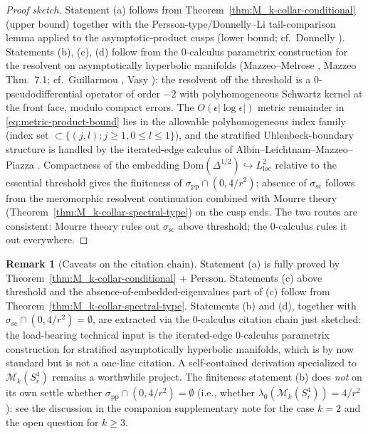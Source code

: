 \documentclass[11pt,letterpaper]{article}
\theoremstyle{definition}
\newtheorem{remark}[theorem]{Remark}
\newcommand{\cM}{\mathcal{M}}
\newcommand{\Lap}{\Delta}
\begin{document}
\begin{proof}[Proof sketch]
Statement (a) follows from Theorem~\ref{thm:M_k-collar-conditional} (upper bound) together with the Persson-type/Donnelly--Li tail-comparison lemma applied to the asymptotic-product cusps (lower bound; cf.\ Donnelly \cite{Donnelly1981}). Statements (b), (c), (d) follow from the 0-calculus parametrix construction for the resolvent on asymptotically hyperbolic manifolds (Mazzeo--Melrose \cite{MazzeoMelrose1987}, Mazzeo \cite{Mazzeo1991} Thm.~7.1; cf.\ Guillarmou \cite{Guillarmou2005}, Vasy \cite{Vasy2013}): the resolvent off the threshold is a $0$-pseudodifferential operator of order $-2$ with polyhomogeneous Schwartz kernel at the front face, modulo compact errors. The $O(\epsilon|\log\epsilon|)$ metric remainder in \eqref{eq:metric-product-bound} lies in the allowable polyhomogeneous index family (index set $\subset \{(j,l) : j \ge 1, 0 \le l \le 1\}$), and the stratified Uhlenbeck-boundary structure is handled by the iterated-edge calculus of Albin--Leichtnam--Mazzeo--Piazza \cite{ALMP2012}. Compactness of the embedding $\mathrm{Dom}(\Lap^{1/2}) \hookrightarrow L^2_{\mathrm{loc}}$ relative to the essential threshold gives the finiteness of $\sigma_{\mathrm{pp}}\cap(0, 4/r^2)$; absence of $\sigma_{\mathrm{sc}}$ follows from the meromorphic resolvent continuation combined with Mourre theory (Theorem~\ref{thm:M_k-collar-spectral-type}) on the cusp ends. The two routes are consistent: Mourre theory rules out $\sigma_{\mathrm{sc}}$ above threshold; the 0-calculus rules it out everywhere.
\end{proof}

\begin{remark}[Caveats on the citation chain]\label{rmk:MM-caveats}
Statement (a) is fully proved by Theorem~\ref{thm:M_k-collar-conditional} + Persson. Statements (c) above threshold and the absence-of-embedded-eigenvalues part of (c) follow from Theorem~\ref{thm:M_k-collar-spectral-type}. Statements (b) and (d), together with $\sigma_{\mathrm{sc}}\cap(0, 4/r^2) = \emptyset$, are extracted via the 0-calculus citation chain just sketched: the load-bearing technical input is the iterated-edge $0$-calculus parametrix construction for stratified asymptotically hyperbolic manifolds, which is by now standard but is not a one-line citation. A self-contained derivation specialized to $\cM_k(S^4_r)$ remains a worthwhile project. The finiteness statement (b) does \emph{not} on its own settle whether $\sigma_{\mathrm{pp}}\cap (0, 4/r^2) = \emptyset$ (i.e., whether $\lambda_0(\cM_k(S^4_r)) = 4/r^2$): see the discussion in the companion supplementary note for the case $k=2$ and the open question for $k\ge 3$.
\end{remark}
\fi
\end{document}
